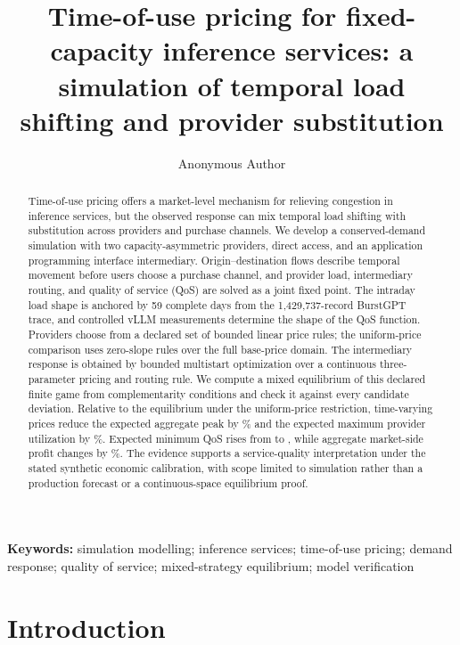\documentclass[11pt,a4paper]{article}
\title{\textbf{Time-of-use pricing for fixed-capacity inference services: a simulation of temporal load shifting and provider substitution}}
\author{Anonymous Author}
\date{}
\begin{document}
\maketitle


\begin{abstract}
Time-of-use pricing offers a market-level mechanism for relieving congestion in inference services, but the observed response can mix temporal load shifting with substitution across providers and purchase channels. We develop a conserved-demand simulation with two capacity-asymmetric providers, direct access, and an application programming interface intermediary. Origin--destination flows describe temporal movement before users choose a purchase channel, and provider load, intermediary routing, and quality of service (QoS) are solved as a joint fixed point. The intraday load shape is anchored by 59 complete days from the 1,429,737-record BurstGPT trace, and controlled vLLM measurements determine the shape of the QoS function. Providers choose from a declared set of \ProviderCandidateCount{} bounded linear price rules; the uniform-price comparison uses \UniformCandidateCount{} zero-slope rules over the full base-price domain. The intermediary response is obtained by bounded multistart optimization over a continuous three-parameter pricing and routing rule. We compute a mixed equilibrium of this declared finite game from complementarity conditions and check it against every candidate deviation. Relative to the equilibrium under the uniform-price restriction, time-varying prices reduce the expected aggregate peak by \AggregatePeakReductionPercent\% and the expected maximum provider utilization by \MaximumUtilisationReductionPercent\%. Expected minimum QoS rises from \UniformMinimumQoS{} to \DynamicMinimumQoS{}, while aggregate market-side profit changes by \MarketProfitChangePercent\%. The evidence supports a service-quality interpretation under the stated synthetic economic calibration, with scope limited to simulation rather than a production forecast or a continuous-space equilibrium proof.
\end{abstract}

\noindent\textbf{Keywords:} simulation modelling; inference services; time-of-use pricing; demand response; quality of service; mixed-strategy equilibrium; model verification

\section{Introduction}
\label{sec:introduction}
\end{document}
